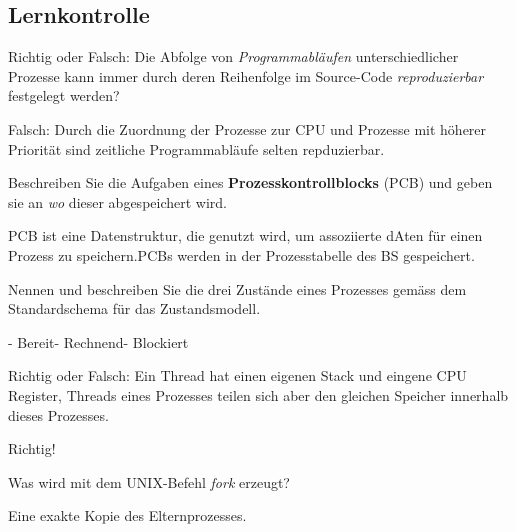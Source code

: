 \documentclass{article}
\begin{document}
\subsection{Lernkontrolle}
\begin{tcolorbox}[colback=white!10!white,colframe=lightgray!75!black,
  savelowerto=\jobname_ex.tex,breakable,enhanced,lines before break=40]

\justifying
Richtig oder Falsch: Die Abfolge von \textit{Programmabläufen} unterschiedlicher Prozesse kann immer durch deren Reihenfolge im Source-Code \textit{reproduzierbar} festgelegt werden?

\tcblower

\justifying
Falsch: Durch die Zuordnung der Prozesse zur CPU und Prozesse mit höherer Priorität sind zeitliche Programmabläufe selten repduzierbar.
\end{tcolorbox}
\begin{tcolorbox}[colback=white!10!white,colframe=lightgray!75!black,
  savelowerto=\jobname_ex.tex,breakable,enhanced,lines before break=40]

\justifying
Beschreiben Sie die Aufgaben eines \textbf{Prozesskontrollblocks} (PCB) und geben sie an \textit{wo} dieser abgespeichert wird.

\tcblower

\justifying
PCB ist eine Datenstruktur, die genutzt wird, um assoziierte dAten für einen Prozess zu speichern.PCBs werden in der Prozesstabelle des BS gespeichert.
\end{tcolorbox}
\begin{tcolorbox}[colback=white!10!white,colframe=lightgray!75!black,
  savelowerto=\jobname_ex.tex,breakable,enhanced,lines before break=40]

\justifying
Nennen und beschreiben Sie die drei Zustände eines Prozesses gemäss dem Standardschema für das Zustandsmodell.

\tcblower

\justifying
- Bereit- Rechnend- Blockiert
\end{tcolorbox}
\begin{tcolorbox}[colback=white!10!white,colframe=lightgray!75!black,
  savelowerto=\jobname_ex.tex,breakable,enhanced,lines before break=40]

\justifying
Richtig oder Falsch: Ein Thread hat einen eigenen Stack und eingene CPU Register, Threads eines Prozesses teilen sich aber den gleichen Speicher innerhalb dieses Prozesses.

\tcblower

\justifying
Richtig!
\end{tcolorbox}
\begin{tcolorbox}[colback=white!10!white,colframe=lightgray!75!black,
  savelowerto=\jobname_ex.tex,breakable,enhanced,lines before break=40]

\justifying
Was wird mit dem UNIX-Befehl \textit{fork} erzeugt?

\tcblower

\justifying
Eine exakte Kopie des Elternprozesses.
\end{tcolorbox}
\end{document}
